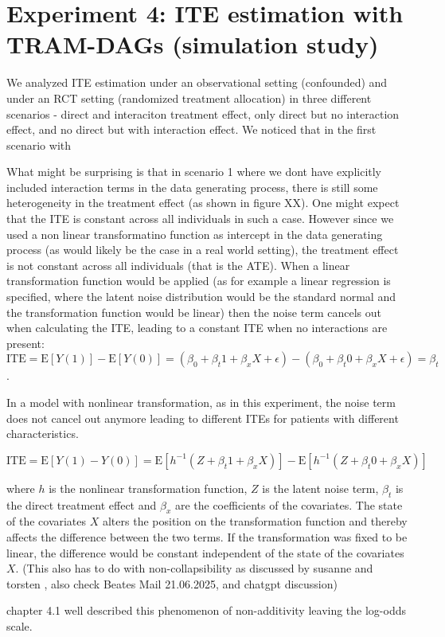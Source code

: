 \section{Experiment 4: ITE estimation with TRAM-DAGs (simulation study)} \label{sec:disc_experiment4}


We analyzed ITE estimation under an observational setting (confounded) and under an RCT setting (randomized treatment allocation) in three different scenarios - direct and interaciton treatment effect, only direct but no interaction effect, and no direct but with interaction effect. We noticed that in the first scenario with 


What might be surprising is that in scenario 1 where we dont have explicitly included interaction terms in the data generating process, there is still some heterogeneity in the treatment effect (as shown in figure XX). One might expect that the ITE is constant across all individuals in such a case. However since we used a non linear transformatino function as intercept in the data generating process (as would likely be the case in a real world setting), the treatment effect is not constant across all individuals (that is the ATE). When a linear transformation function would be applied (as for example a linear regression is specified, where the latent noise distribution would be the standard normal and the transformation function would be linear) then the noise term cancels out when calculating the ITE, leading to a constant ITE when no interactions are present: $\text{ITE} = \text{E}[Y(1)] -\text{E}[Y(0)] = (\beta_0 + \beta_t 1 + \beta_x X + \epsilon) - (\beta_0 + \beta_t 0 + \beta_x X + \epsilon) = \beta_t$.

In a model with nonlinear transformation, as in this experiment, the noise term does not cancel out anymore leading to different ITEs for patients with different characteristics.

\begin{equation}
\text{ITE} = \text{E}[Y(1) - Y(0)] = \text{E}[h^{-1}(Z + \beta_t 1 + \beta_x X)] - \text{E}[h^{-1}(Z + \beta_t 0 + \beta_x X)] 
\end{equation}

where $h$ is the nonlinear transformation function, $Z$ is the latent noise term, $\beta_t$ is the direct treatment effect and $\beta_x$ are the coefficients of the covariates. The state of the covariates $X$ alters the position on the transformation function and thereby affects the difference between the two terms. If the transformation was fixed to be linear, the difference would be constant independent of the state of the covariates $X$. (This also has to do with non-collapsibility as discussed by susanne and torsten , also check Beates Mail 21.06.2025, and chatgpt discussion)

\citep{hoogland2021} chapter 4.1 well described this phenomenon of non-additivity leaving the log-odds scale.





